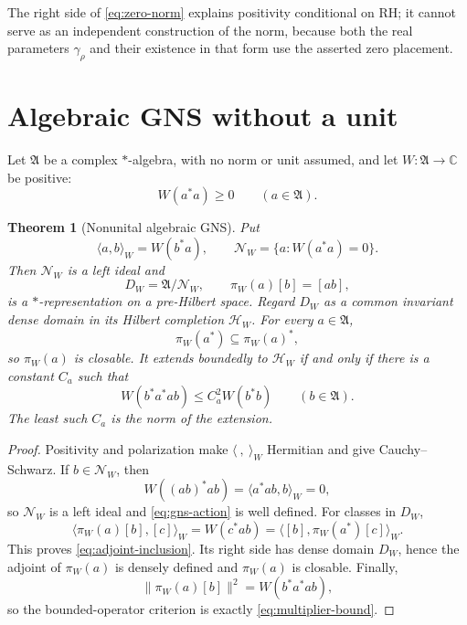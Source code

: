 \documentclass[11pt]{article}
\newtheorem{theorem}{Theorem}[section]
\theoremstyle{definition}
\theoremstyle{remark}
\numberwithin{equation}{section}
\newcommand{\cN}{\mathcal N}
\newcommand{\C}{\mathbb C}
\begin{document}
The right side of \eqref{eq:zero-norm} explains positivity conditional
on RH; it cannot serve as an independent construction of the norm,
because both the real parameters $\gamma_\rho$ and their existence in
that form use the asserted zero placement.

\section{Algebraic GNS without a unit}

Let $\mathfrak A$ be a complex $*$-algebra, with no norm or unit assumed,
and let $W:\mathfrak A\to\C$ be positive:
\[
 W(a^*a)\geq0\qquad(a\in\mathfrak A).
\]

\begin{theorem}[Nonunital algebraic GNS]
Put
\[
 \langle a,b\rangle_W=W(b^*a),
 \qquad
 \cN_W=\{a:W(a^*a)=0\}.
\]
Then $\cN_W$ is a left ideal and
\begin{equation}
 D_W=\mathfrak A/\cN_W,
 \qquad
 \pi_W(a)[b]=[ab],
 \label{eq:gns-action}
\end{equation}
is a $*$-representation on a pre-Hilbert space.  Regard $D_W$ as a
common invariant dense domain in its Hilbert completion $\mathcal H_W$.
For every $a\in\mathfrak A$,
\begin{equation}
 \pi_W(a^*)\subseteq\pi_W(a)^*,
 \label{eq:adjoint-inclusion}
\end{equation}
so $\pi_W(a)$ is closable.  It extends boundedly to $\mathcal H_W$ if
and only if there is a constant $C_a$ such that
\begin{equation}
 W(b^*a^*ab)\leq C_a^2W(b^*b)
 \qquad(b\in\mathfrak A).
 \label{eq:multiplier-bound}
\end{equation}
The least such $C_a$ is the norm of the extension.
\end{theorem}

\begin{proof}
Positivity and polarization make $\langle\ ,\ \rangle_W$ Hermitian and
give Cauchy--Schwarz.  If $b\in\cN_W$, then
\[
 W((ab)^*ab)=\langle a^*ab,b\rangle_W=0,
\]
so $\cN_W$ is a left ideal and \eqref{eq:gns-action} is well defined.
For classes in $D_W$,
\[
 \langle\pi_W(a)[b],[c]\rangle_W
 =W(c^*ab)
 =\langle[b],\pi_W(a^*)[c]\rangle_W.
\]
This proves \eqref{eq:adjoint-inclusion}.  Its right side has dense
domain $D_W$, hence the adjoint of $\pi_W(a)$ is densely defined and
$\pi_W(a)$ is closable.  Finally,
\[
 \|\pi_W(a)[b]\|^2=W(b^*a^*ab),
\]
so the bounded-operator criterion is exactly
\eqref{eq:multiplier-bound}.
\end{proof}
\end{document}

